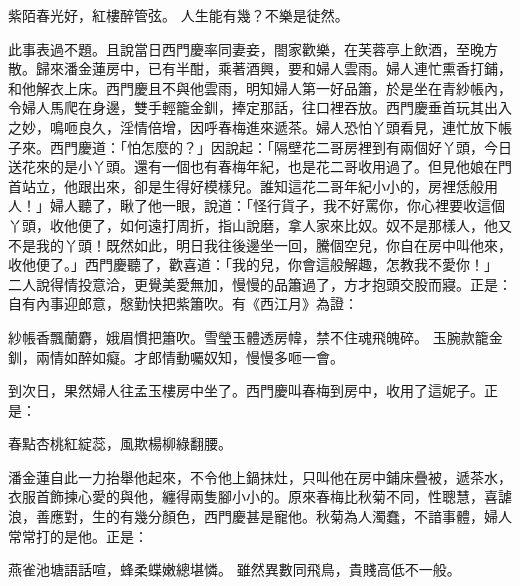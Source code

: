 紫陌春光好，紅樓醉管弦。
人生能有幾？不樂是徒然。

此事表過不題。且說當日西門慶率同妻妾，閤家歡樂，在芙蓉亭上飲酒，至晚方散。歸來潘金蓮房中，已有半酣，乘著酒興，要和婦人雲雨。婦人連忙熏香打鋪，和他解衣上床。西門慶且不與他雲雨，明知婦人第一好品簫，於是坐在青紗帳內，令婦人馬爬在身邊，雙手輕籠金釧，捧定那話，往口裡吞放。西門慶垂首玩其出入之妙，鳴咂良久，淫情倍增，因呼春梅進來遞茶。婦人恐怕丫頭看見，連忙放下帳子來。西門慶道：「怕怎麼的？」因說起：「隔壁花二哥房裡到有兩個好丫頭，今日送花來的是小丫頭。還有一個也有春梅年紀，也是花二哥收用過了。但見他娘在門首站立，他跟出來，卻是生得好模樣兒。誰知這花二哥年紀小小的，房裡恁般用人！」婦人聽了，瞅了他一眼，說道：「怪行貨子，我不好罵你，你心裡要收這個丫頭，收他便了，如何遠打周折，指山說磨，拿人家來比奴。奴不是那樣人，他又不是我的丫頭！既然如此，明日我往後邊坐一回，騰個空兒，你自在房中叫他來，收他便了。」西門慶聽了，歡喜道：「我的兒，你會這般解趣，怎教我不愛你！」 二人說得情投意洽，更覺美愛無加，慢慢的品簫過了，方才抱頭交股而寢。正是：自有內事迎郎意，慇勤快把紫簫吹。有《西江月》為證：

紗帳香飄蘭麝，娥眉慣把簫吹。雪瑩玉體透房幃，禁不住魂飛魄碎。
玉腕款籠金釧，兩情如醉如癡。才郎情動囑奴知，慢慢多咂一會。

到次日，果然婦人往孟玉樓房中坐了。西門慶叫春梅到房中，收用了這妮子。正是：

春點杏桃紅綻蕊，風欺楊柳綠翻腰。

潘金蓮自此一力抬舉他起來，不令他上鍋抹灶，只叫他在房中鋪床疊被，遞茶水，衣服首飾揀心愛的與他，纏得兩隻腳小小的。原來春梅比秋菊不同，性聰慧，喜謔浪，善應對，生的有幾分顏色，西門慶甚是寵他。秋菊為人濁蠢，不諳事體，婦人常常打的是他。正是：

燕雀池塘語話喧，蜂柔蝶嫩總堪憐。
雖然異數同飛鳥，貴賤高低不一般。

